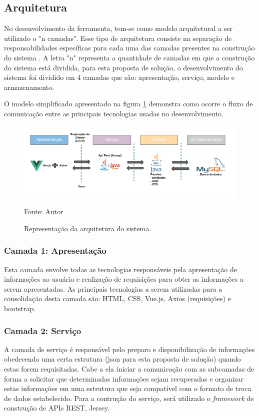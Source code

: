 \subsection{Arquitetura}

No desenvolvimento da ferramenta, tem-se como modelo arquitetural a ser utilizado o "n camadas". Esse tipo
de arquitetura consiste na separação de responsabilidades específicas para cada uma das camadas presentes 
na construção do sistema \cite{MSF}. A letra "n" representa a quantidade de camadas em que a construção do sistema 
está dividida, para esta proposta de solução, o desenvolvimento do sistema foi dividido em 4 camadas que são: apresentação, serviço, modelo
e armazenamento.

O modelo simplificado apresentado na figura \ref{arquitetura} demonstra como ocorre o fluxo de comunicação entre as principais tecnologias
usadas no desenvolvimento.

\begin{figure}[h]
	\centering
	\includegraphics[keepaspectratio=true,scale=0.8]{figuras/arquitetura.png}
	\caption{Representação da arquitetura do sistema.}
	Fonte: {Autor}
	\label{arquitetura}
\end{figure}		

\pagebreak

\subsubsection{Camada 1: Apresentação}
Esta camada envolve todas as tecnologias responsáveis pela apresentação de informações ao usuário e realização de requisições para obter as informações
a serem apresentadas. As principais tecnologias a serem utilizadas para a consolidação desta camada são: HTML, CSS, Vue.js, Axios (requisições) e bootstrap.

\subsubsection{Camada 2: Serviço}
A camada de serviço é responsável pelo preparo e disponibilização de informações obedecendo uma certa estrutura (json para esta proposta de solução) quando estas forem requisitadas. 
Cabe a ela iniciar a comunicação com as subcamadas de forma a solicitar que determinadas informações sejam recuperadas e organizar estas informações em uma estrutura que seja compatível
com o formato de troca de dados estabelecido. Para a contrução do serviço, será utilizado o \textit{framework} de construção de APIs REST, Jersey.


